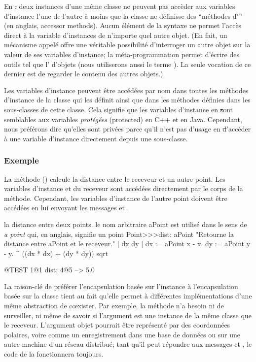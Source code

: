 \documentclass[a4paper,10pt,twoside]{book}
\begin{document}
En \st, deux instances d'une même classe ne peuvent pas accèder aux variables d'instance l'une de l'autre à moins que la classe ne définisse des ``méthodes d''' (en anglais, accessor methods).
Aucun élément de la syntaxe ne permet l'accès direct à la variable d'instances de n'importe quel autre objet.
(En fait, un mécanisme appelé 
offre une véritable possibilité d'interroger un autre objet sur la valeur de ses variables d'instance; la méta-programmation permet d'écrire des outils tel que l' d'objets (nous utiliserons aussi le terme ). La seule vocation de ce dernier est de regarder le contenu des autres objets.)

Les variables d'instance peuvent être accédées par 
nom dans toutes les méthodes d'instance de la classe qui les définit
ainsi que dans les méthodes définies dans les sous-classes de cette classe.
Cela signifie que les variables d'instance en \st sont semblables aux
variables \emph{protégées} (protected) en C++ et en Java. Cependant,
nous préférons dire qu'elles sont privées parce qu'il n'est pas d'usage en \st d'accéder à une variable d'instance directement depuis une sous-classe. 
\subsubsection{Exemple}
La méthode  () calcule la distance entre le receveur et un autre point. Les variables d'instance  et  du receveur sont accédées directement par le corps de la méthode. Cependant, les variables d'instance de l'autre point doivent être accédées en lui envoyant les messages  et .

\begin{method}[dist:]{la distance entre deux points. le nom arbitraire aPoint est utilisé dans le sens de \emph{a point} qui, en anglais, signifie un point}
Point>>>dist: aPoint 
	"Retourne la distance entre aPoint et le receveur."
	| dx dy |
	dx := aPoint x - x.
	dy :=  aPoint y - y.
	^ ((dx * dx) + (dy * dy)) sqrt
\end{method}

\begin{code}{@TEST}
1@1 dist: 4@5 --> 5.0
\end{code}

La raison-clé de préférer l'encapsulation basée sur l'instance
à l'encapsulation basée sur la classe tient au fait qu'elle permet
à différentes implémentations d'une même abstraction de c\oe{}xister.
Par exemple, la méthode  n'a besoin ni de surveiller, ni 
même de savoir si l'argument  est une instance de la même classe
que le receveur.  L'argument objet pourrait être représenté par des
coordonnées polaires, voire comme un enregistrement dans une base de données ou sur une autre machine d'un réseau distribué; tant qu'il peut répondre
aux messages  et , le code de la  fonctionnera toujours.
\end{document}
